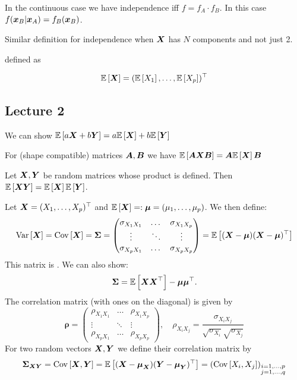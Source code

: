 In the continuous case we have independence iff $f=f_A\cdot f_B$. In this case $f(\x_B|\x_A) = f_B(\x_B)$.

Similar definition for independence when $\X$ has $N$ components and not just 2.

\textbf{}

 defined as

$$
    \ev{\X} = (\ev{X_1},\dots,\ev{X_p})^\top
$$
\subsection*{Lecture 2}

We can show
$
    \ev{a \X + b \Y} = a\ev{\X}+ b \ev{\Y}
$

For (shape compatible) matrices $\mA, \mB$ we have
$
    \ev{\mA\X \mB} = \mA\ev{\X}\mB
$

Let $\X, \Y$ be random matrices whose product is defined. Then $\ev{\X\Y} = \ev{\X}\ev{\Y}$.

\textbf{}

Let $\X=(X_1,\dots,X_p)^\top$ and $\ev{\X}=:\M=({\mu_1,\dots,\mu_p})$. We then define:
$$
    \var{\X} = \cov{\X} = \SS = \begin{pmatrix}
        \sigma_{X_1X_1} & \dots & \sigma_{X_1X_p} \\
        \vdots & \ddots & \vdots \\
        \sigma_{X_pX_1} & \dots & \sigma_{X_pX_p}
    \end{pmatrix}
    =\ev{(\X-\M)(\X-\M)^\top}
$$
This natrix is . We can also show:
$$
    \SS = \ev{\X\X^\top} - \M\M^\top.
$$
The correlation matrix (with ones on the diagonal) is given by
$$
    \boldsymbol{\rho}
    =
    \begin{pmatrix}
        \rho_{X_1X_1} & \dots & \rho_{X_1X_p} \\
        \vdots & \ddots & \vdots \\
        \rho_{X_pX_1} & \dots & \rho_{X_pX_p}
    \end{pmatrix}
    ,\quad
    \rho_{X_iX_j} = \frac{\sigma_{X_iX_j}}{\sqrt{\sigma_{X_i}}\sqrt{\sigma_{X_j}}}
$$
For two random vectors $\X,\Y$ we define their correlation matrix by
$$
    \SS_{\X\Y} 
    = \cov{\X,\Y} 
    = \ev{(\X-\M_{\X})(\Y-\M_{\Y})^\top}
    =(\cov{X_i,X_j})_{\substack{i=1,\dots,p \\ j= 1,\dots,q}}
$$

